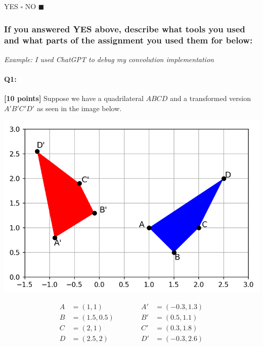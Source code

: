 
YES $\square$ NO $\blacksquare$ %


\subsubsection*{If you answered YES above, describe what tools you used and what parts of the assignment you used them for below:}


\textit{Example: I used ChatGPT to debug my convolution implementation}

\pagebreak
\paragraph{Q1:} \textbf{[10 points]}
Suppose we have a quadrilateral $ABCD$ and a transformed version $A'B'C'D'$ as seen in the image below.

\includegraphics[width=\textwidth * 5/10]{images/quads_lstsq.png}

\begin{equation}
\begin{split}
A&=(1, 1)\\
B&=(1.5, 0.5)\\
C&=(2, 1)\\
D&=(2.5, 2)
\end{split}
\quad\quad\quad
\begin{split}
A'&=(-0.3, 1.3)\\
B'&=(0.5, 1.1)\\
C'&=(0.3, 1.8)\\
D'&=(-0.3, 2.6)
\end{split}
\end{equation}

